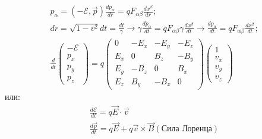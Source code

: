 \begin{gather*}
p_\alpha = (- \mathcal E, \vec p)
\frac{dp_\alpha}{dr} = qF_{\alpha\beta}\frac{dx^\beta}{dr};\\
dr = \sqrt{1-v^2}dt = \frac{dt}{\gamma} \rightarrow \gamma\frac{dp_\alpha}{dt} = qF_{\alpha\beta}\gamma\frac{dx^\beta}{dt} \rightarrow \frac{dp_\alpha}{dt} = qF_{\alpha\beta}\frac{dx^\beta}{dt};\\
\frac{d}{dt}\left(\begin{matrix}-\mathcal E\\ p_x\\p_y\\p_z\end{matrix}\right) = 
q\left(\begin{matrix}
0&-E_x&-E_y&-E_z\\
E_x&0&B_z&-B_y\\
E_y&-B_z&0&B_x\\
E_z&B_y&-B_x&0
\end{matrix}\right)\left(\begin{matrix}1\\v_x\\v_y\\v_z\end{matrix}\right)
\end{gather*}
или:
\begin{gather*}
\frac{d\mathcal E}{dt} = q\vec E\cdot \vec v\\
\frac{d\vec p}{dt} = q\vec E + q\vec v \times \vec B (\text{Сила Лоренца})
\end{gather*}
 
